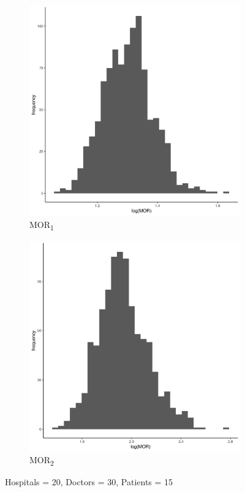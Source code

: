 \documentclass[
  letterpaper,
  DIV=11,
  numbers=noendperiod,
  titlepage]{scrartcl}
\begin{document}
\vspace{10mm}

\begin{figure}
\centering
\begin{subfigure}{.49\textwidth}
    \centering
    \includegraphics[width=.95\linewidth]{../../plots/three-lvl-ran-int/low-prev/hist_20_30_15_three_lvl_low_prev_mor1.png}  
    \caption{MOR\textsubscript{1}}
    \label{l20m30n151}
\end{subfigure}
\begin{subfigure}{.49\textwidth}
    \centering
    \includegraphics[width=.95\linewidth]{../../plots/three-lvl-ran-int/low-prev/hist_20_30_15_three_lvl_low_prev_mor2.png}
    \caption{MOR\textsubscript{2}}
    \label{l20m30n152}
\end{subfigure}
\caption{Hospitals = 20, Doctors = 30, Patients = 15}
\label{mor2}
\end{figure}
\end{document}
